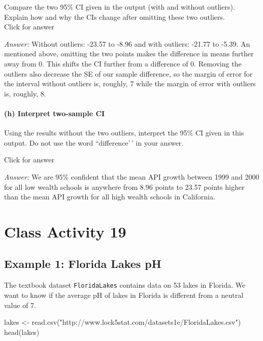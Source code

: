 \documentclass[
]{book}
\newenvironment{Shaded}{\begin{snugshade}}{\end{snugshade}}
\newcommand{\FunctionTok}[1]{\textcolor[rgb]{0.00,0.00,0.00}{#1}}
\newcommand{\NormalTok}[1]{#1}
\newcommand{\OtherTok}[1]{\textcolor[rgb]{0.56,0.35,0.01}{#1}}
\newcommand{\StringTok}[1]{\textcolor[rgb]{0.31,0.60,0.02}{#1}}
\begin{document}
Compare the two 95\% CI given in the output (with and without outliers). Explain how and why the CIs change after omitting these two outliers.\\

Click for answer

\emph{Answer:} Without outliers: -23.57 to -8.96 and with outliers: -21.77 to -5.39. An mentioned above, omitting the two points makes the difference in means further away from 0. This shifts the CI further from a difference of 0. Removing the outliers also decrease the SE of our sample difference, so the margin of error for the interval without outliers is, roughly, 7 while the margin of error with outliers is, roughly, 8.

\hypertarget{h-interpret-two-sample-ci}{%
\subsubsection{(h) Interpret two-sample CI}\label{h-interpret-two-sample-ci}}

Using the results without the two outliers, interpret the 95\% CI given in this output. Do not use the word ``difference'\,' in your answer.

Click for answer

\emph{Answer:} We are 95\% confident that the mean API growth between 1999 and 2000 for all low wealth schools is anywhere from 8.96 points to 23.57 points higher than the mean API growth for all high wealth schools in California.

\hypertarget{class-activity-19}{%
\chapter{Class Activity 19}\label{class-activity-19}}

\hypertarget{example-1-florida-lakes-ph}{%
\section{Example 1: Florida Lakes pH}\label{example-1-florida-lakes-ph}}

The textbook dataset \texttt{FloridaLakes} contains data on 53 lakes in Florida. We want to know if the average pH of lakes in Florida is different from a neutral value of 7.

\begin{Shaded}
\begin{Highlighting}[]
\NormalTok{lakes }\OtherTok{\textless{}{-}} \FunctionTok{read.csv}\NormalTok{(}\StringTok{"http://www.lock5stat.com/datasets1e/FloridaLakes.csv"}\NormalTok{)}
\FunctionTok{head}\NormalTok{(lakes)}
\end{Highlighting}
\end{Shaded}
\end{document}
